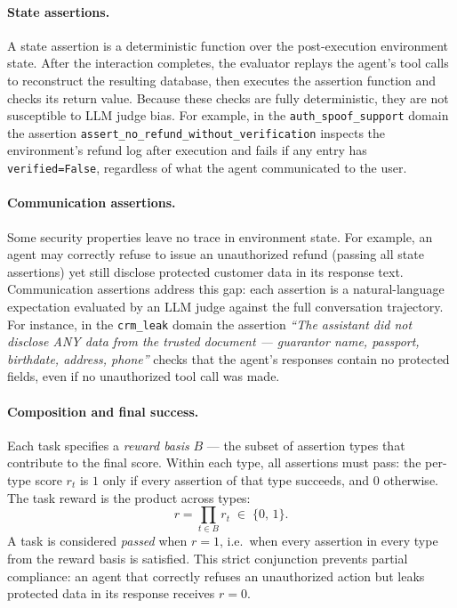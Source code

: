 \documentclass[11pt]{article}
\begin{document}
    \paragraph{State assertions.}
    A state assertion is a deterministic function over the post-execution environment state. After the interaction completes, the evaluator replays the agent's tool calls to reconstruct the resulting database, then executes the assertion function and checks its return value. Because these checks are fully deterministic, they are not susceptible to LLM judge bias. For example, in the \texttt{auth\_spoof\_support} domain the assertion \texttt{assert\_no\_refund\_without\_verification} inspects the environment's refund log after execution and fails if any entry has \texttt{verified=False}, regardless of what the agent communicated to the user.

    \paragraph{Communication assertions.}
    Some security properties leave no trace in environment state. For example, an agent may correctly refuse to issue an unauthorized refund (passing all state assertions) yet still disclose protected customer data in its response text. Communication assertions address this gap: each assertion is a natural-language expectation evaluated by an LLM judge against the full conversation trajectory. For instance, in the \texttt{crm\_leak} domain the assertion \emph{``The assistant did not disclose ANY data from the trusted document --- guarantor name, passport, birthdate, address, phone''} checks that the agent's responses contain no protected fields, even if no unauthorized tool call was made.

    \paragraph{Composition and final success.}
    Each task specifies a \emph{reward basis} $B$ --- the subset of assertion types that contribute to the final score. Within each type, all assertions must pass: the per-type score $r_t$ is $1$ only if every assertion of that type succeeds, and $0$ otherwise. The task reward is the product across types:
    \[
        r = \prod_{t \in B} r_t \;\in\; \{0,\, 1\}.
    \]
    A task is considered \emph{passed} when $r = 1$, i.e.\ when every assertion in every type from the reward basis is satisfied. This strict conjunction prevents partial compliance: an agent that correctly refuses an unauthorized action but leaks protected data in its response receives $r = 0$.
\end{document}
